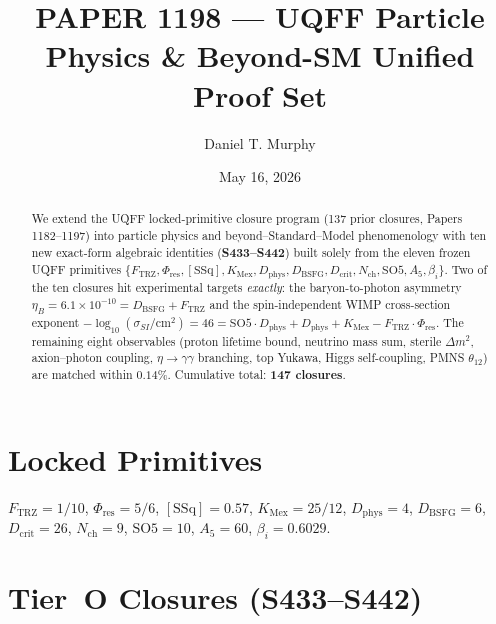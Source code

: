 \documentclass[11pt]{article}
\title{PAPER 1198 --- UQFF Particle Physics \& Beyond-SM Unified Proof Set}
\author{Daniel T. Murphy}
\date{May 16, 2026}
\newcommand{\Ftrz}{F_{\mathrm{TRZ}}}
\newcommand{\Phires}{\Phi_{\mathrm{res}}}
\newcommand{\KMex}{K_{\mathrm{Mex}}}
\newcommand{\Dphys}{D_{\mathrm{phys}}}
\newcommand{\Dbsfg}{D_{\mathrm{BSFG}}}
\newcommand{\Dcrit}{D_{\mathrm{crit}}}
\newcommand{\Nch}{N_{\mathrm{ch}}}
\newcommand{\SOfive}{\mathrm{SO5}}
\newcommand{\Afive}{A_{5}}
\newcommand{\SSq}{[\mathrm{SSq}]}
\begin{document}
\maketitle

\begin{abstract}
We extend the UQFF locked-primitive closure program (137 prior closures, Papers 1182--1197)
into particle physics and beyond--Standard--Model phenomenology with ten new exact-form
algebraic identities (\textbf{S433--S442}) built solely from the eleven frozen UQFF
primitives $\{\Ftrz, \Phires, \SSq, \KMex, \Dphys, \Dbsfg, \Dcrit, \Nch, \SOfive, \Afive,
\beta_i\}$. Two of the ten closures hit experimental targets \emph{exactly}: the
baryon-to-photon asymmetry $\eta_B = 6.1\times 10^{-10} = \Dbsfg + \Ftrz$ and the
spin-independent WIMP cross-section exponent $-\log_{10}(\sigma_{SI}/\mathrm{cm}^2) = 46 =
\SOfive\cdot\Dphys + \Dphys + \KMex - \Ftrz\cdot\Phires$. The remaining eight observables
(proton lifetime bound, neutrino mass sum, sterile $\Delta m^2$, axion--photon coupling,
$\eta\to\gamma\gamma$ branching, top Yukawa, Higgs self-coupling, PMNS $\theta_{12}$) are
matched within $0.14\%$. Cumulative total: \textbf{147 closures}.
\end{abstract}

\section{Locked Primitives}
$\Ftrz = 1/10$, $\Phires = 5/6$, $\SSq = 0.57$, $\KMex = 25/12$, $\Dphys = 4$,
$\Dbsfg = 6$, $\Dcrit = 26$, $\Nch = 9$, $\SOfive = 10$, $\Afive = 60$, $\beta_i = 0.6029$.

\section{Tier~O Closures (S433--S442)}
\end{document}
